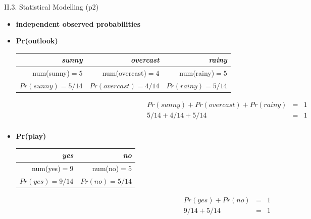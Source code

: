 \documentclass[handout]{beamer}
\newcommand{\strong}[1]{\textbf{\color{teal} #1}}
\begin{document}
\begin{frame}{II.3. Statistical Modelling (p2)}
\begin{itemize}
\item[] \strong{independent observed probabilities}
\item \textbf{Pr(outlook)}\\
\begin{tabular}{|r|r|r|}
\emph{sunny}     & \emph{overcast}     & \emph{rainy}   \\
\hline
num(sunny)$=5$   & num(overcast)$=4$   & num(rainy)$=5$ \\
$Pr(sunny)=5/14$ & $Pr(overcast)=4/14$ & $Pr(rainy)=5/14$ \\
\hline
\end{tabular}
\[
\begin{array}{rcl}
Pr(sunny) + Pr(overcast) + Pr(rainy) & = & 1 \\
5/14 + 4/14 + 5/14  & = & 1 \\
\end{array}
\]
%
\item \textbf{Pr(play)}\\
\begin{tabular}{|r|r|}
\emph{yes}     & \emph{no} \\
\hline
num(yes)$=9$   & num(no)$=5$ \\
$Pr(yes)=9/14$ & $Pr(no)=5/14$ \\
\hline
\end{tabular}
\[
\begin{array}{rcl}
Pr(yes) + Pr(no) & = & 1 \\
9/14 + 5/14 & = & 1 \\
\end{array}
\]
\end{itemize}
\end{frame}
\end{document}
